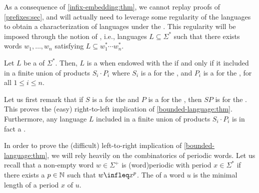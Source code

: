 \AP As a consequence of \cref{infix-embedding:thm}, we cannot replay
proofs of \cref{prefixes:sec}, and will
actually need to leverage some regularity of the languages to obtain a
characterization of  languages under the . This regularity will be imposed through the notion of , i.e., languages $L \subseteq \Sigma^*$ such that there exists words
$w_1, \dots, w_n$ satisfying $L \subseteq w_1^* \cdots w_n^*$.

\begin{theorem}[restate=bounded-language:thm,label=bounded-language:thm]
    \label{bounded-language:thm}
    Let $L$ be a  of $\Sigma^*$. Then,
    $L$ is a  when endowed with the 
     if and only if it included in a finite union of 
    products $S_i \cdot P_i$ where 
    $S_i$ is a  for the , and 
    $P_i$ is a  for the ,
    for all $1 \leq i \leq n$.
\end{theorem}

Let us first remark that if $S$ is a  for the 
and $P$ is a  for the , then $SP$ is
 for the . This proves the (easy)
right-to-left implication of \cref{bounded-language:thm}. Furthermore, any
language $L$ included in a finite union of products $S_i \cdot P_i$
is in fact a . 


\AP In order to prove the (difficult) left-to-right implication of
\cref{bounded-language:thm}, we will rely heavily on the
combinatorics of periodic words. Let us recall that a non-empty word $w \in
\Sigma^+$ is \intro(word){periodic} with period $x \in \Sigma^*$ if there
exists a $p \in \mathbb{N}$ such that $w \infleq x^p$. The  of
a word $u$ is the minimal length of a period $x$ of $u$.

